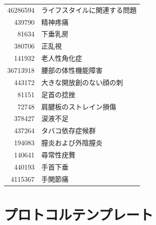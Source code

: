 \documentclass[
  11pt]{book}
\theoremstyle{definition}
\theoremstyle{definition}
\theoremstyle{definition}
\theoremstyle{definition}
\theoremstyle{remark}
\begin{document}
\begin{longtable}[]{@{}rl@{}}
46286594 & ライフスタイルに関連する問題 \\
439790 & 精神疼痛 \\
81634 & 下垂乳房 \\
380706 & 正乱視 \\
141932 & 老人性角化症 \\
36713918 & 腰部の体性機能障害 \\
443172 & 大きな開放創のない顔の刺 \\
81151 & 足首の捻挫 \\
72748 & 肩腱板のストレイン損傷 \\
378427 & 涙液不足 \\
437264 & タバコ依存症候群 \\
194083 & 膣炎および外陰膣炎 \\
140641 & 尋常性疣贅 \\
440193 & 手首下垂 \\
4115367 & 手関節痛 \\
\end{longtable}

\chapter{プロトコルテンプレート}\label{ProtocolTemplate}
\end{document}
